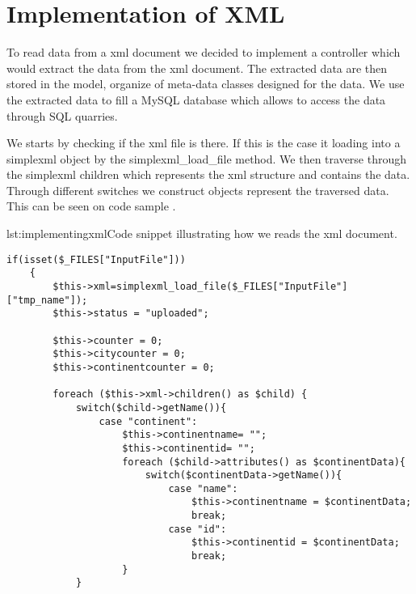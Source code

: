 \section{Implementation of XML}
To read data from a xml document we decided to implement a controller which would extract the data from the xml document. The extracted data are then stored in the model, organize of meta-data classes designed for the data. We use the extracted data to fill a MySQL database which allows to access the data through SQL quarries.

We starts by checking if the xml file is there. If this is the case it loading into a simplexml object by the simplexml_load_file method. We then traverse through the simplexml children which represents the xml structure and contains the data. Through different switches we construct objects represent the traversed data. This can be seen on code sample .

\begin{code}{lst:implementingxml}{Code snippet illustrating how we reads the xml document.}
\begin{lstlisting}
if(isset($_FILES["InputFile"]))
	{
    	$this->xml=simplexml_load_file($_FILES["InputFile"]["tmp_name"]);
        $this->status = "uploaded";

	    $this->counter = 0;
	    $this->citycounter = 0;
	    $this->continentcounter = 0;

	    foreach ($this->xml->children() as $child) {
	    	switch($child->getName()){
	   			case "continent":
	  				$this->continentname= "";
	    			$this->continentid= "";
	    			foreach ($child->attributes() as $continentData){
	    				switch($continentData->getName()){
	    					case "name":
	    						$this->continentname = $continentData;
	    						break;
    						case "id":
	    						$this->continentid = $continentData;
	    						break;
					}
  			}
  			\end{lstlisting}
\end{code}